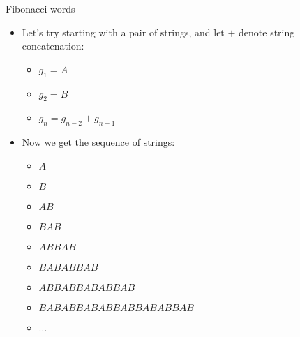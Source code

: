 \documentclass[10pt]{beamer}
\newcommand{\bi}{\begin{itemize}}
\newcommand{\ei}{\end{itemize}}
\begin{document}
\begin{frame}{Fibonacci words}
    \bi
        \item Let's try starting with a pair of strings, and let $+$ denote string concatenation:
            \bi
                \item $g_1 = A$
                \item $g_2 = B$
                \item $g_n = g_{n-2} + g_{n-1}$
            \ei
        \vspace{10pt}
        \item Now we get the sequence of strings:
            \bi
                \item $A$
                \item $B$
                \item $AB$
                \item $BAB$
                \item $ABBAB$
                \item $BABABBAB$
                \item $ABBABBABABBAB$
                \item $BABABBABABBABBABABBAB$
                \item $\ldots$
            \ei
    \ei
\end{frame}
\end{document}
